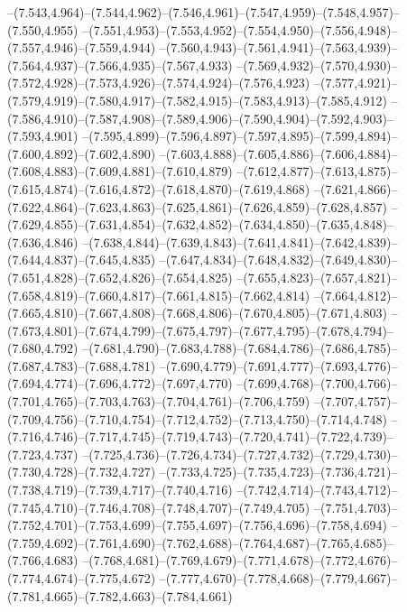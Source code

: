   --(7.543,4.964)--(7.544,4.962)--(7.546,4.961)--(7.547,4.959)--(7.548,4.957)--(7.550,4.955)%
  --(7.551,4.953)--(7.553,4.952)--(7.554,4.950)--(7.556,4.948)--(7.557,4.946)--(7.559,4.944)%
  --(7.560,4.943)--(7.561,4.941)--(7.563,4.939)--(7.564,4.937)--(7.566,4.935)--(7.567,4.933)%
  --(7.569,4.932)--(7.570,4.930)--(7.572,4.928)--(7.573,4.926)--(7.574,4.924)--(7.576,4.923)%
  --(7.577,4.921)--(7.579,4.919)--(7.580,4.917)--(7.582,4.915)--(7.583,4.913)--(7.585,4.912)%
  --(7.586,4.910)--(7.587,4.908)--(7.589,4.906)--(7.590,4.904)--(7.592,4.903)--(7.593,4.901)%
  --(7.595,4.899)--(7.596,4.897)--(7.597,4.895)--(7.599,4.894)--(7.600,4.892)--(7.602,4.890)%
  --(7.603,4.888)--(7.605,4.886)--(7.606,4.884)--(7.608,4.883)--(7.609,4.881)--(7.610,4.879)%
  --(7.612,4.877)--(7.613,4.875)--(7.615,4.874)--(7.616,4.872)--(7.618,4.870)--(7.619,4.868)%
  --(7.621,4.866)--(7.622,4.864)--(7.623,4.863)--(7.625,4.861)--(7.626,4.859)--(7.628,4.857)%
  --(7.629,4.855)--(7.631,4.854)--(7.632,4.852)--(7.634,4.850)--(7.635,4.848)--(7.636,4.846)%
  --(7.638,4.844)--(7.639,4.843)--(7.641,4.841)--(7.642,4.839)--(7.644,4.837)--(7.645,4.835)%
  --(7.647,4.834)--(7.648,4.832)--(7.649,4.830)--(7.651,4.828)--(7.652,4.826)--(7.654,4.825)%
  --(7.655,4.823)--(7.657,4.821)--(7.658,4.819)--(7.660,4.817)--(7.661,4.815)--(7.662,4.814)%
  --(7.664,4.812)--(7.665,4.810)--(7.667,4.808)--(7.668,4.806)--(7.670,4.805)--(7.671,4.803)%
  --(7.673,4.801)--(7.674,4.799)--(7.675,4.797)--(7.677,4.795)--(7.678,4.794)--(7.680,4.792)%
  --(7.681,4.790)--(7.683,4.788)--(7.684,4.786)--(7.686,4.785)--(7.687,4.783)--(7.688,4.781)%
  --(7.690,4.779)--(7.691,4.777)--(7.693,4.776)--(7.694,4.774)--(7.696,4.772)--(7.697,4.770)%
  --(7.699,4.768)--(7.700,4.766)--(7.701,4.765)--(7.703,4.763)--(7.704,4.761)--(7.706,4.759)%
  --(7.707,4.757)--(7.709,4.756)--(7.710,4.754)--(7.712,4.752)--(7.713,4.750)--(7.714,4.748)%
  --(7.716,4.746)--(7.717,4.745)--(7.719,4.743)--(7.720,4.741)--(7.722,4.739)--(7.723,4.737)%
  --(7.725,4.736)--(7.726,4.734)--(7.727,4.732)--(7.729,4.730)--(7.730,4.728)--(7.732,4.727)%
  --(7.733,4.725)--(7.735,4.723)--(7.736,4.721)--(7.738,4.719)--(7.739,4.717)--(7.740,4.716)%
  --(7.742,4.714)--(7.743,4.712)--(7.745,4.710)--(7.746,4.708)--(7.748,4.707)--(7.749,4.705)%
  --(7.751,4.703)--(7.752,4.701)--(7.753,4.699)--(7.755,4.697)--(7.756,4.696)--(7.758,4.694)%
  --(7.759,4.692)--(7.761,4.690)--(7.762,4.688)--(7.764,4.687)--(7.765,4.685)--(7.766,4.683)%
  --(7.768,4.681)--(7.769,4.679)--(7.771,4.678)--(7.772,4.676)--(7.774,4.674)--(7.775,4.672)%
  --(7.777,4.670)--(7.778,4.668)--(7.779,4.667)--(7.781,4.665)--(7.782,4.663)--(7.784,4.661)%
